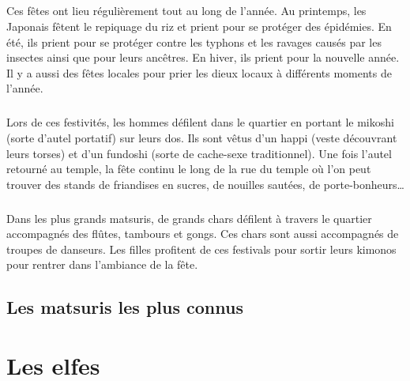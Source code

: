 \paragraph{}
Ces fêtes ont lieu régulièrement tout au long de l’année. Au printemps, les Japonais fêtent le repiquage du riz et prient pour se protéger des épidémies. En été, ils prient pour se protéger contre les typhons et les ravages causés par les insectes ainsi que pour leurs ancêtres.  En hiver, ils prient pour la nouvelle année. Il y a aussi des fêtes locales pour prier les dieux locaux à différents moments de l’année. 
\paragraph{}
Lors de ces festivités, les hommes défilent dans le quartier en portant le mikoshi (sorte d’autel portatif) sur leurs dos. Ils sont vêtus d’un happi (veste découvrant leurs torses) et d’un fundoshi (sorte de cache-sexe traditionnel). Une fois l’autel retourné au temple, la fête continu le long de la rue du temple où l’on peut trouver des stands de friandises en sucres, de nouilles sautées, de porte-bonheurs… 
\paragraph{}
Dans les plus grands matsuris, de grands chars défilent à travers le quartier accompagnés des flûtes, tambours et gongs. Ces chars sont aussi accompagnés de troupes de danseurs. Les filles profitent de ces festivals pour sortir leurs kimonos pour rentrer dans l’ambiance de la fête.

\section{Les matsuris les plus connus}

\chapter{Les elfes}